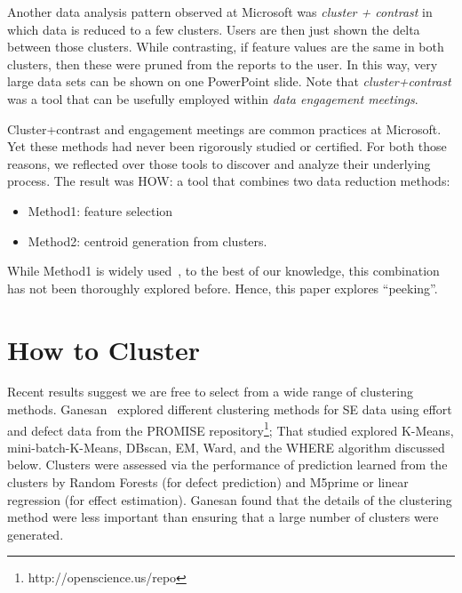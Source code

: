 \documentclass[conference]{IEEEtran}
\newcommand{\bi}{\begin{itemize}}
\newcommand{\ei}{\end{itemize}}
\begin{document}
Another data analysis pattern observed
at Microsoft was  {\em cluster + contrast} in which
data is  reduced to a few
  clusters. Users are then just shown the delta between those
  clusters. While contrasting, if feature values are
  the same in both clusters, then these were pruned from
  the reports to the user. In this way, very large
data sets can be shown on one PowerPoint
slide. Note that {\em cluster+contrast} was a tool that can be usefully employed within
{\em data engagement meetings}.


Cluster+contrast and engagement
meetings are common practices at Microsoft. Yet  these methods had never been rigorously studied or certified.
For both those reasons,
 we reflected over those tools to discover and analyze their
underlying process. The result was HOW: a tool
that combines two
data reduction methods:\bi
\item Method1: feature selection
\item Method2: centroid generation from   clusters.
\ei
While Method1 is widely used~\cite{Menzies2010},
to the best of our knowledge, this combination has not been thoroughly explored before.
Hence, this paper explores ``peeking''.

\section{How to Cluster}
Recent results suggest  we are free to select from a wide range of 
clustering methods.  Ganesan~\cite{div14} explored 
different clustering methods for SE data using   effort and defect data from
the PROMISE repository\footnote{http://openscience.us/repo};
That studied explored
K-Means, mini-batch-K-Means, DBscan, EM, Ward, and the WHERE algorithm discussed
below.
Clusters were assessed via the performance of prediction 
learned from the clusters by Random Forests (for defect prediction)
and M5prime or linear regression (for effect estimation).  Ganesan found
 that the details of the clustering method were less important than ensuring that  a large number of clusters were generated.
\end{document}
